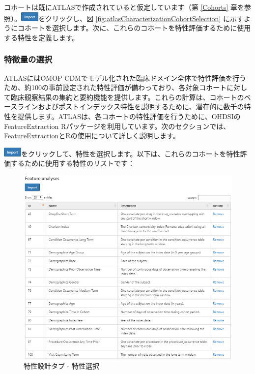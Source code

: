 \documentclass[
  11pt]{book}
\theoremstyle{definition}
\theoremstyle{definition}
\theoremstyle{definition}
\theoremstyle{definition}
\theoremstyle{remark}
\begin{document}
コホートは既にATLASで作成されていると仮定しています（第 \ref{Cohorts} 章を参照）。\includegraphics{images/Characterization/atlasImportButton.png}をクリックし、図 \ref{fig:atlasCharacterizationCohortSelection} に示すようにコホートを選択します。次に、これらのコホートを特性評価するために使用する特性を定義します。

\subsubsection*{特徴量の選択}\label{ux7279ux5fb4ux91cfux306eux9078ux629e}

ATLASにはOMOP CDMでモデル化された臨床ドメイン全体で特性評価を行うため、約100の事前設定された特性評価が備わっており、各対象コホートに対して臨床観察結果の集約と要約機能を提供します。これらの計算は、コホートのベースラインおよびポストインデックス特性を説明するために、潜在的に数千の特性を提供します。ATLASは、各コホートの特性評価を行うために、OHDSIのFeatureExtraction Rパッケージを利用しています。次のセクションでは、FeatureExtractionとRの使用について詳しく説明します。

\includegraphics{images/Characterization/atlasImportButton.png}をクリックして、特性を選択します。以下は、これらのコホートを特性評価するために使用する特性のリストです：

\begin{figure}

{\centering \includegraphics[width=1\linewidth]{images/Characterization/atlasCharacterizationFeatureSelection} 

}

\caption{特性設計タブ - 特性選択}\label{fig:atlasCharacterizationFeatureSelection}
\end{figure}
\end{document}
